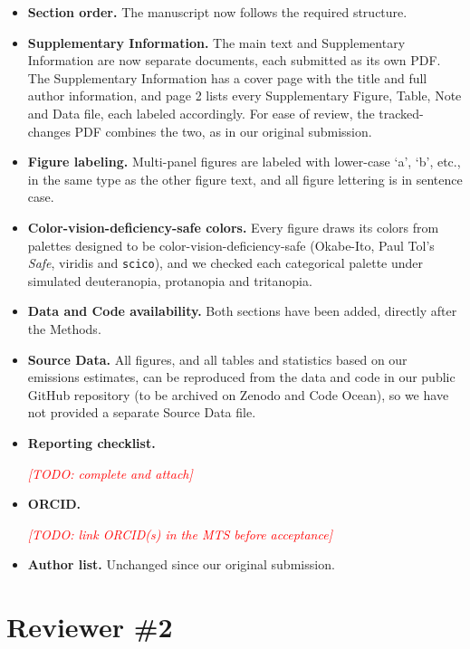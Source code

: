 \documentclass[11pt]{article}
\newcommand{\reviewer}[1]{\bigskip\section*{#1}}
\newcommand{\todo}[1]{\par\smallskip\noindent\textcolor{red}{\itshape[TODO: #1]}}
\begin{document}
\begin{itemize}[leftmargin=*, itemsep=2pt]
  \item \textbf{Section order.} The manuscript now follows the required structure.
  \item \textbf{Supplementary Information.} The main text and Supplementary Information are now separate documents, each submitted as its own PDF. The Supplementary Information has a cover page with the title and full author information, and page 2 lists every Supplementary Figure, Table, Note and Data file, each labeled accordingly. For ease of review, the tracked-changes PDF combines the two, as in our original submission.
  \item \textbf{Figure labeling.} Multi-panel figures are labeled with lower-case `a', `b', etc., in the same type as the other figure text, and all figure lettering is in sentence case.
  \item \textbf{Color-vision-deficiency-safe colors.} Every figure draws its colors from palettes designed to be color-vision-deficiency-safe (Okabe-Ito, Paul Tol's \emph{Safe}, viridis and \texttt{scico}), and we checked each categorical palette under simulated deuteranopia, protanopia and tritanopia.
  \item \textbf{Data and Code availability.} Both sections have been added, directly after the Methods.
  \item \textbf{Source Data.} All figures, and all tables and statistics based on our emissions estimates, can be reproduced from the data and code in our public GitHub repository (to be archived on Zenodo and Code Ocean), so we have not provided a separate Source Data file.
  \item \textbf{Reporting checklist.} \todo{complete and attach}
  \item \textbf{ORCID.} \todo{link ORCID(s) in the MTS before acceptance}
  \item \textbf{Author list.} Unchanged since our original submission.
\end{itemize}

\reviewer{Reviewer \#2}
\end{document}
